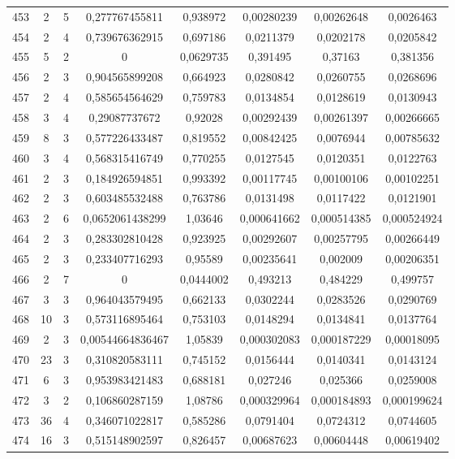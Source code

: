 \begin{longtable}{|c|c|c|c|c|c|c|c|}
453 & 2 & 5 & 0,277767455811 & 0,938972 & 0,00280239 & 0,00262648 & 0,0026463  \\
454 & 2 & 4 & 0,739676362915 & 0,697186 & 0,0211379 & 0,0202178 & 0,0205842  \\
455 & 5 & 2 & 0 & 0,0629735 & 0,391495 & 0,37163 & 0,381356  \\
456 & 2 & 3 & 0,904565899208 & 0,664923 & 0,0280842 & 0,0260755 & 0,0268696  \\
457 & 2 & 4 & 0,585654564629 & 0,759783 & 0,0134854 & 0,0128619 & 0,0130943  \\
458 & 3 & 4 & 0,29087737672 & 0,92028 & 0,00292439 & 0,00261397 & 0,00266665  \\
459 & 8 & 3 & 0,577226433487 & 0,819552 & 0,00842425 & 0,0076944 & 0,00785632  \\
460 & 3 & 4 & 0,568315416749 & 0,770255 & 0,0127545 & 0,0120351 & 0,0122763  \\
461 & 2 & 3 & 0,184926594851 & 0,993392 & 0,00117745 & 0,00100106 & 0,00102251  \\
462 & 2 & 3 & 0,603485532488 & 0,763786 & 0,0131498 & 0,0117422 & 0,0121901  \\
463 & 2 & 6 & 0,0652061438299 & 1,03646 & 0,000641662 & 0,000514385 & 0,000524924  \\
464 & 2 & 3 & 0,283302810428 & 0,923925 & 0,00292607 & 0,00257795 & 0,00266449  \\
465 & 2 & 3 & 0,233407716293 & 0,95589 & 0,00235641 & 0,002009 & 0,00206351  \\
466 & 2 & 7 & 0 & 0,0444002 & 0,493213 & 0,484229 & 0,499757  \\
467 & 3 & 3 & 0,964043579495 & 0,662133 & 0,0302244 & 0,0283526 & 0,0290769  \\
468 & 10 & 3 & 0,573116895464 & 0,753103 & 0,0148294 & 0,0134841 & 0,0137764  \\
469 & 2 & 3 & 0,00544664836467 & 1,05839 & 0,000302083 & 0,000187229 & 0,00018095  \\
470 & 23 & 3 & 0,310820583111 & 0,745152 & 0,0156444 & 0,0140341 & 0,0143124  \\
471 & 6 & 3 & 0,953983421483 & 0,688181 & 0,027246 & 0,025366 & 0,0259008  \\
472 & 3 & 2 & 0,106860287159 & 1,08786 & 0,000329964 & 0,000184893 & 0,000199624  \\
473 & 36 & 4 & 0,346071022817 & 0,585286 & 0,0791404 & 0,0724312 & 0,0744605  \\
474 & 16 & 3 & 0,515148902597 & 0,826457 & 0,00687623 & 0,00604448 & 0,00619402  \\

\end{longtable}
